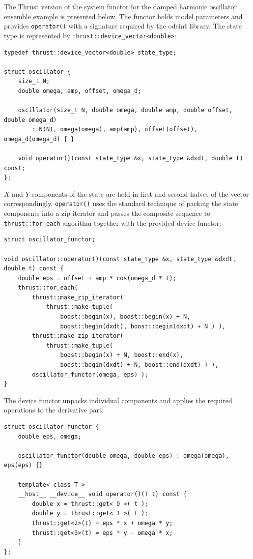 \documentclass[final]{siamltex}
\newcommand{\code}[1]{\lstinline|#1|}
\begin{document}
The Thrust version of the system functor for the damped harmonic oscillator
ensemble example is presented below. The functor holds model parameters and
provides \code{operator()} with a signature required by the odeint library. The
state type is represented by \code{thrust::device_vector<double>}:
\begin{lstlisting}
typedef thrust::device_vector<double> state_type;

struct oscillator {
    size_t N;
    double omega, amp, offset, omega_d;

    oscillator(size_t N, double omega, double amp, double offset, double omega_d)
        : N(N), omega(omega), amp(amp), offset(offset), omega_d(omega_d) { }

    void operator()(const state_type &x, state_type &dxdt, double t) const;
};
\end{lstlisting}
$X$ and $Y$ components of the state are held in first and second halves of the
vector correspondingly.  \code{operator()} uses the standard technique of
packing the state components into a zip iterator and passes the composite
sequence to \code{thrust::for_each} algorithm together with the provided device
functor:
\begin{lstlisting}[firstnumber=12]
struct oscillator_functor;

void oscillator::operator()(const state_type &x, state_type &dxdt, double t) const {
    double eps = offset + amp * cos(omega_d * t);
    thrust::for_each(
        thrust::make_zip_iterator(
            thrust::make_tuple(
                boost::begin(x), boost::begin(x) + N,
                boost::begin(dxdt), boost::begin(dxdt) + N ) ),
        thrust::make_zip_iterator(
            thrust::make_tuple(
                boost::begin(x) + N, boost::end(x),
                boost::begin(dxdt) + N, boost::end(dxdt) ) ),
        oscillator_functor(omega, eps) );
}
\end{lstlisting}
The device functor unpacks individual components and applies the required
operations to the derivative part:
\begin{lstlisting}[firstnumber=last]
struct oscillator_functor {
    double eps, omega;

    oscillator_functor(double omega, double eps) : omega(omega), eps(eps) {}

    template< class T >
    __host__ __device__ void operator()(T t) const {
        double x = thrust::get< 0 >( t );
        double y = thrust::get< 1 >( t );
        thrust::get<2>(t) = eps * x + omega * y;
        thrust::get<3>(t) = eps * y - omega * x;
    }
};
\end{lstlisting}
\end{document}
